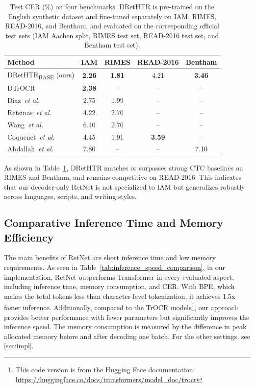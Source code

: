 \documentclass[times, review, 10pt]{elsarticle}
\begin{document}
\begin{table}[t]
\centering
\caption{Test CER (\%) on four benchmarks. DRetHTR is pre-trained on the English synthetic dataset and fine-tuned separately on IAM, RIMES, READ-2016, and Bentham, and evaluated on the corresponding official test sets (IAM Aachen split, RIMES test set, READ-2016 test set, and Bentham test set).}
\small
\begin{tabular}{lcccc}
\toprule
\textbf{Method} & \textbf{IAM} & \textbf{RIMES} & \textbf{READ-2016} & \textbf{Bentham} \\
\midrule
DRetHTR\textsubscript{BASE} (ours)  & \textbf{2.26} & \textbf{1.81} & 4.21 & \textbf{3.46} \\
DTrOCR~\cite{DTrOCR}     & \textbf{2.38} & -- & -- & -- \\
Diaz~\textit{et al.}~\cite{Diaz2021RethinkingTL}     & 2.75 & 1.99 & -- & -- \\
Retsinas~\textit{et al.}~\cite{retsinas22das}        & 4.22 & 2.70 & -- & -- \\
Wang~\textit{et al.}~\cite{DAN}                      & 6.40 & 2.70 & -- & -- \\
Coquenet~\textit{et al.}~\cite{VAN} & 4.45 & 1.91 & \textbf{3.59} & -- \\
Abdallah~\textit{et al.}~\cite{abdallah20jimag}      & 7.80 & -- & -- & 7.10 \\
\bottomrule
\end{tabular}
\label{tab:cross_dataset_cer}
\end{table}

As shown in Table~\ref{tab:cross_dataset_cer}, DRetHTR matches or surpasses strong CTC baselines on RIMES and Bentham, and remains competitive on READ-2016. This indicates that our decoder-only RetNet is not specialized to IAM but generalizes robustly across languages, scripts, and writing styles.


\subsection{Comparative Inference Time and Memory Efficiency}
The main benefits of RetNet are short inference time and low memory requirements. As seen in Table~\ref{tab:inference_speed_comparison}, in our implementation,  RetNet outperforms Transformer in every evaluated aspect, including inference time, memory consumption, and CER. With BPE, which makes the total tokens less than character-level tokenization, it achieves 1.5x faster inference. Additionally, compared to the TrOCR models\footnote{This code version is from the Hugging Face documentation: \url{https://huggingface.co/docs/transformers/model_doc/trocr}}, our approach provides better performance with fewer parameters but significantly improves the inference speed. The memory consumption is measured by the difference in peak allocated memory before and after decoding one batch. For the other settings, see \cref{sec:impl}.
\end{document}
